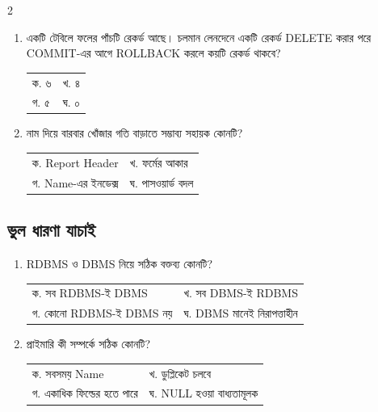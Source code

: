 \begin{multicols}{2}
\begin{enumerate}[resume]
\item \begin{minipage}[t]{\linewidth}
একটি টেবিলে ফলের পাঁচটি রেকর্ড আছে। চলমান লেনদেনে একটি রেকর্ড DELETE করার পরে COMMIT-এর আগে ROLLBACK করলে কয়টি রেকর্ড থাকবে?
\par
\begin{tabularx}{\linewidth}{@{}X X@{}}
ক. ৬ & খ. ৪ \\
গ. ৫ & ঘ. ০ \\
\end{tabularx}
\end{minipage}
\vspace{1pt}

\item \begin{minipage}[t]{\linewidth}
নাম দিয়ে বারবার খোঁজার গতি বাড়াতে সম্ভাব্য সহায়ক কোনটি?
\par
\begin{tabularx}{\linewidth}{@{}X X@{}}
ক. Report Header & খ. ফর্মের আকার \\
গ. Name-এর ইনডেক্স & ঘ. পাসওয়ার্ড বদল \\
\end{tabularx}
\end{minipage}
\vspace{1pt}

\end{enumerate}
\subsection{ভুল ধারণা যাচাই}
\begin{enumerate}[resume]

\item \begin{minipage}[t]{\linewidth}
RDBMS ও DBMS নিয়ে সঠিক বক্তব্য কোনটি?
\par
\begin{tabularx}{\linewidth}{@{}X X@{}}
ক. সব RDBMS-ই DBMS & খ. সব DBMS-ই RDBMS \\
গ. কোনো RDBMS-ই DBMS নয় & ঘ. DBMS মানেই নিরাপত্তাহীন \\
\end{tabularx}
\end{minipage}
\vspace{1pt}

\item \begin{minipage}[t]{\linewidth}
প্রাইমারি কী সম্পর্কে সঠিক কোনটি?
\par
\begin{tabularx}{\linewidth}{@{}X X@{}}
ক. সবসময় Name & খ. ডুপ্লিকেট চলবে \\
গ. একাধিক ফিল্ডের হতে পারে & ঘ. NULL হওয়া বাধ্যতামূলক \\
\end{tabularx}
\end{minipage}
\vspace{1pt}


\end{enumerate}
\end{multicols}
